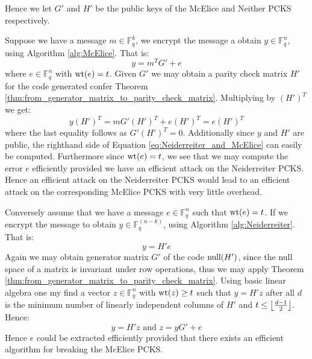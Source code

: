 Hence we let $G'$ and $H'$ be the public keys of the McElice and Neither PCKS respectively.

Suppose we have a message $m \in \mathbb{F}_q^k$, we encrypt the message a obtain $y \in \mathbb{F}_q^{n}$, using Algorithm \ref{alg:McElice}. That is:
\begin{equation*}
  y = m^T G' + e
\end{equation*}
where $e \in \mathbb{F}_q^n$ with $\mathrm{wt}(e) = t$. Given $G'$ we may obtain a parity check matrix $H'$ for the code generated confer Theorem \ref{thm:from_generator_matrix_to_parity_check_matrix}. Multiplying by $(H')^T$ we get:
\begin{equation}\label{eq:Neiderreiter_and_McElice}
  y(H')^T = mG'(H')^T + e (H')^T = e (H')^T
\end{equation}
where the last equality follows as $G'(H')^T = 0$. Additionally since $y$ and $H'$ are public, the righthand side of Equation \eqref{eq:Neiderreiter_and_McElice} can easily be computed. Furthermore since $\mathrm{wt}(e) = t$, we see that we may compute the error $e$ efficiently provided we have an efficient attack on the Neiderreiter PCKS. Hence an efficient attack on the Neiderreiter PCKS would lead to an efficient attack on the corresponding McElice PCKS with very little overhead.

Conversely assume that we have a message $e \in \mathbb{F}_q^{n}$ such that $\mathrm{wt}(e) = t$. If we encrypt the message to obtain $y \in \mathbb{F}_q^{(n - k)}$, using Algorithm \ref{alg:Neiderreiter}. That is:
\begin{equation*}
  y = H'e
\end{equation*}
Again we may obtain generator matrix $G'$ of the code $\textnormal{null}(H')$, since the null space of a matrix is invariant under row operations, thus we may apply Theorem \ref{thm:from_generator_matrix_to_parity_check_matrix}. Using basic linear algebra one my find a vector $z \in \mathbb{F}_q^n$ with $\mathrm{wt}(z) \geq t$ such that $y = H'z$ after all $d$ is the minimum number of linearly independent columns of $H'$ and $t \leq \left\lfloor\frac{d - 1}{2}\right\rfloor$. Hence:
\begin{equation*}
  y = H'z \text{ and } z = yG' + e
\end{equation*}
Hence $e$ could be extracted efficiently provided that there exists an efficient algorithm for breaking the McElice PCKS.


